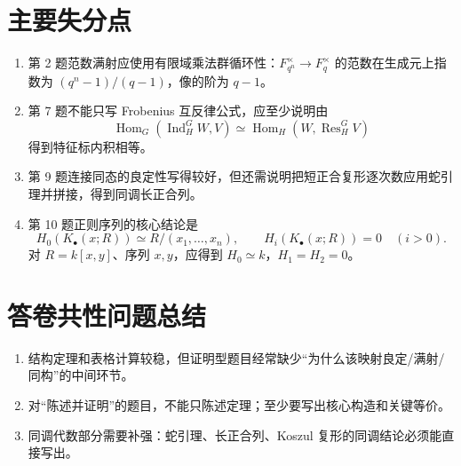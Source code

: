 \documentclass[11pt]{article}
\begin{document}
\section*{主要失分点}

\begin{enumerate}
  \item 第 2 题范数满射应使用有限域乘法群循环性：\(F_{q^n}^{\times}\to F_q^\times\) 的范数在生成元上指数为 \((q^n-1)/(q-1)\)，像的阶为 \(q-1\)。
  \item 第 7 题不能只写 Frobenius 互反律公式，应至少说明由
  \[
    \operatorname{Hom}_G(\operatorname{Ind}_H^G W,V)
    \simeq
    \operatorname{Hom}_H(W,\operatorname{Res}_H^G V)
  \]
  得到特征标内积相等。
  \item 第 9 题连接同态的良定性写得较好，但还需说明把短正合复形逐次数应用蛇引理并拼接，得到同调长正合列。
  \item 第 10 题正则序列的核心结论是
  \[
    H_0(K_\bullet(x;R))\simeq R/(x_1,\dots,x_n),\qquad
    H_i(K_\bullet(x;R))=0\quad(i>0).
  \]
  对 \(R=k[x,y]\)、序列 \(x,y\)，应得到 \(H_0\simeq k\)，\(H_1=H_2=0\)。
\end{enumerate}

\section*{答卷共性问题总结}

\begin{enumerate}
  \item 结构定理和表格计算较稳，但证明型题目经常缺少“为什么该映射良定/满射/同构”的中间环节。
  \item 对“陈述并证明”的题目，不能只陈述定理；至少要写出核心构造和关键等价。
  \item 同调代数部分需要补强：蛇引理、长正合列、Koszul 复形的同调结论必须能直接写出。
\end{enumerate}
\end{document}
